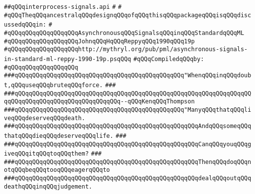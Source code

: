 \label{src/lib/std/src/nj/interprocess-signals.api}
\verb|##qQQqinterprocess-signals.api|\newline
\verb|#|\newline
\verb|#|\newline
\verb|#qQQqTheqQQqancestralqQQqdesignqQQqofqQQqthisqQQqpackageqQQqisqQQqdiscussedqQQqin:|\newline
\verb|#|\newline
\verb|#qQQqqQQqqQQqqQQqqQQqAsynchronousqQQqSignalsqQQqinqQQqStandardqQQqML|\newline
\verb|#qQQqqQQqqQQqqQQqqQQqJohnqQQqHqQQqReppyqQQq1990qQQq19p|\newline
\verb|#qQQqqQQqqQQqqQQqqQQqhttp://mythryl.org/pub/pml/asynchronous-signals-in-standard-ml-reppy-1990-19p.psqQQq|\newline
\newline
\verb|#qQQqCompiledqQQqby:|\newline
\verb|#qQQqqQQqqQQqqQQqqQQq|\newline
\newline
\newline
\newline
\verb|###qQQqqQQqqQQqqQQqqQQqqQQqqQQqqQQqqQQqqQQqqQQqqQQq"WhenqQQqinqQQqdoubt,qQQquseqQQqbruteqQQqforce.|\newline
\verb|###|\newline
\verb|###qQQqqQQqqQQqqQQqqQQqqQQqqQQqqQQqqQQqqQQqqQQqqQQqqQQqqQQqqQQqqQQqqQQqqQQqqQQqqQQqqQQqqQQqqQQqqQQqqQQq--qQQqKenqQQqThompson|\newline
\newline
\newline
\newline
\verb|###qQQqqQQqqQQqqQQqqQQqqQQqqQQqqQQqqQQqqQQqqQQqqQQq"ManyqQQqthatqQQqliveqQQqdeserveqQQqdeath.|\newline
\verb|###qQQqqQQqqQQqqQQqqQQqqQQqqQQqqQQqqQQqqQQqqQQqqQQqqQQqAndqQQqsomeqQQqthatqQQqdieqQQqdeserveqQQqlife.|\newline
\verb|###|\newline
\verb|###qQQqqQQqqQQqqQQqqQQqqQQqqQQqqQQqqQQqqQQqqQQqqQQqqQQqCanqQQqyouqQQqgiveqQQqitqQQqtoqQQqthem?|\newline
\verb|###|\newline
\verb|###qQQqqQQqqQQqqQQqqQQqqQQqqQQqqQQqqQQqqQQqqQQqqQQqqQQqThenqQQqdoqQQqnotqQQqbeqQQqtooqQQqeagerqQQqto|\newline
\verb|###qQQqqQQqqQQqqQQqqQQqqQQqqQQqqQQqqQQqqQQqqQQqqQQqqQQqdealqQQqoutqQQqdeathqQQqinqQQqjudgement.|\newline
